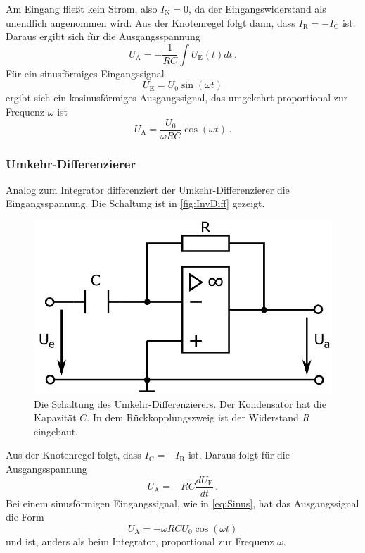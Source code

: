 Am Eingang fließt kein Strom, also $I_\text{N} = 0$, da der Eingangswiderstand als unendlich angenommen wird. Aus der Knotenregel folgt dann, dass $I_\text{R} = - I_\text{C}$ ist. Daraus ergibt sich für die Ausgangsspannung
\begin{equation*}
    U_\text{A} = - \frac{1}{R C} \int U_\text{E}(t) dt \, .
    \label{eq:Integrator}
\end{equation*}
Für ein sinusförmiges Eingangssignal
\begin{equation}
    U_\text{E} = U_0 \sin(\omega t)
    \label{eq:Sinus}
\end{equation}
ergibt sich ein kosinusförmiges Ausgangssignal, das umgekehrt proportional zur Frequenz $\omega$ ist
\begin{equation}
    U_\text{A} = \frac{U_0}{\omega R C} \cos(\omega t) \, .
    \label{eq:Int_Kosinus}
\end{equation}


\subsubsection{Umkehr-Differenzierer}
Analog zum Integrator differenziert der Umkehr-Differenzierer die Eingangsspannung. Die Schaltung ist in \autoref{fig:InvDiff} gezeigt.

\begin{figure}
    \centering
    \includegraphics[width=0.6\linewidth]{./figures/3_InvDiff.jpeg}
    \caption{Die Schaltung des Umkehr-Differenzierers. Der Kondensator hat die Kapazität $C$. In dem Rückkopplungszweig ist der Widerstand $R$ eingebaut. \cite{V51}}
    \label{fig:InvDiff}
\end{figure}
\FloatBarrier

Aus der Knotenregel folgt, dass $I_\text{C} = - I_\text{R}$ ist. Daraus folgt für die Ausgangsspannung
\begin{equation*}
    U_\text{A} = - R C \frac{d U_\text{E}}{dt} \, .
    \label{eq:Differenzierer}
\end{equation*}
Bei einem sinusförmigen Eingangssignal, wie in \autoref{eq:Sinus}, hat das Ausgangssignal die Form 
\begin{equation}
    U_\text{A} = - \omega R C U_0 \cos(\omega t)
    \label{eq:Diff_Kosinus}
\end{equation}
und ist, anders als beim Integrator, proportional zur Frequenz $\omega$.

